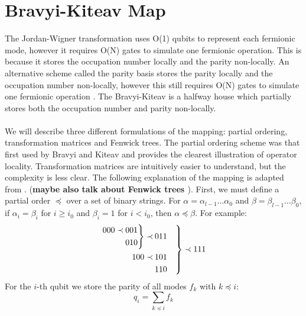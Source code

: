 \documentclass[twoside]{article}
\begin{document}
\section{Bravyi-Kiteav Map}\label{bravyi-kitaev_section}
The Jordan-Wigner transformation uses O(1) qubits to represent each fermionic mode, however it requires O(N) gates to simulate one fermionic operation. This is because it stores the occupation number locally and the parity non-locally. An alternative scheme called the parity basis stores the parity locally and the occupation number non-locally, however this still requires O(N) gates to simulate one fermionic operation \cite{seeley}. The Bravyi-Kiteav is a halfway house which partially stores both the occupation number and parity non-locally.\\\\
We will describe three different formulations of the mapping: partial ordering, transformation matrices and Fenwick trees. The partial ordering scheme was that first used by Bravyi and Kiteav \cite{bravyikitaev} and provides the clearest illustration of operator locality. Transformation matrices are intuitively easier to understand, but the complexity is less clear. The following explanation of the mapping is adapted from \cite{bravyikitaev}. (\textbf{maybe also talk about Fenwick trees \cite{operatorLocality}}). First, we must define a partial order $\preceq$ over a set of binary strings. For $\alpha = \alpha_{l-1}\ldots \alpha_0$ and $\beta = \beta_{l-1}\ldots \beta_0$, if $\alpha_i = \beta_i$ for $i\geq i_0$ and $\beta_i = 1$ for $i < i_0$, then $\alpha \preceq \beta$. For example:
$$
\begin{rcases}
        \begin{aligned}
        \begin{rcases}
                \begin{aligned}
                        000 \prec \>&001 \\
                                  &010
               \end{aligned}
       \end{rcases} \prec \>&011 \\
        100 \prec \>&101\\
                  &110
        \end{aligned}
\end{rcases}
\prec 111
$$
For the $i$-th qubit we store the parity of all modes $f_k$ with $k \preceq i$:
\begin{equation}
        q_i = \sum_{k \preceq i} f_k 
\end{equation}
\end{document}

